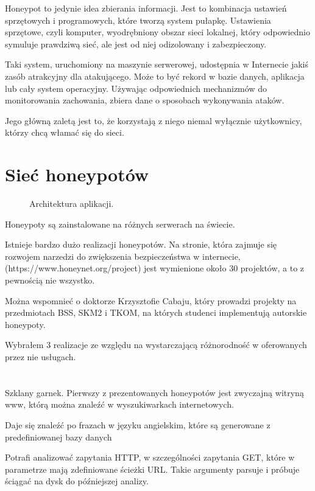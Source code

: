 \documentclass[runningheads,a4paper]{llncs}
\begin{document}
Honeypot to jedynie idea zbierania informacji. Jest to kombinacja ustawień sprzętowych i programowych, które tworzą system pułapkę. Ustawienia sprzętowe, czyli komputer, wyodrębniony obszar sieci lokalnej, który odpowiednio symuluje prawdziwą sieć, ale jest od niej odizolowany i zabezpieczony.

Taki system, uruchomiony na maszynie serwerowej, udostępnia w Internecie jakiś zasób atrakcyjny dla atakującego. Może to być rekord w bazie danych, aplikacja lub cały system operacyjny. Używając odpowiednich mechanizmów do monitorowania zachowania, zbiera dane o sposobach wykonywania ataków.

Jego główną zaletą jest to, że korzystają z niego niemal wyłącznie użytkownicy, którzy chcą włamać się do sieci.

\section{Sieć honeypotów}

\begin{figure}
        \centering
        \caption{Architektura aplikacji.}
        \label{fig:klasyfikator_nn}
\end{figure}

Honeypoty są zainstalowane na różnych serwerach na świecie.

Istnieje bardzo dużo realizacji honeypotów. Na stronie, która zajmuje się rozwojem narzedzi do zwiększenia bezpieczeństwa w internecie, (https://www.honeynet.org/project) jest wymienione około 30 projektów, a to z pewnością nie wszystko.

Można wspomnieć o doktorze Krzysztofie Cabaju, który prowadzi projekty na przedmiotach BSS, SKM2 i TKOM, na których studenci implementują autorskie honeypoty.

Wybrałem 3 realizacje ze względu na wystarczającą różnorodność w oferowanych przez nie usługach.
\section{}
Szklany garnek. Pierwszy z prezentowanych honeypotów jest zwyczajną witryną www, którą można znaleźć w wyszukiwarkach internetowych.

Daje się znaleźć po frazach w języku angielskim, które są generowane z predefiniowanej bazy danych

Potrafi analizować zapytania HTTP, w szczególności zapytania GET, które w parametrze mają zdefiniowane ścieżki URL. Takie argumenty parsuje i próbuje ściągać na dysk do późniejszej analizy.
\end{document}
